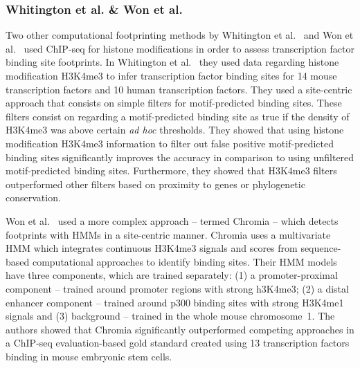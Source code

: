 \subsubsection{Whitington et al. \& Won et al.}
\label{sec:whitington.hon.2}

Two other computational footprinting methods by Whitington et al.~\cite{whitington2009} and Won et al.~\cite{won2010} used ChIP-seq for histone modifications in order to assess transcription factor binding site footprints. In Whitington et al.~\cite{whitington2009} they used data regarding histone modification H3K4me3 to infer transcription factor binding sites for 14 mouse transcription factors and 10 human transcription factors. They used a site-centric approach that consists on simple filters for motif-predicted binding sites. These filters consist on regarding a motif-predicted binding site as true if the density of H3K4me3 was above certain \emph{ad hoc} thresholds. They showed that using histone modification H3K4me3 information to filter out false positive motif-predicted binding sites significantly improves the accuracy in comparison to using unfiltered motif-predicted binding sites. Furthermore, they showed that H3K4me3 filters outperformed other filters based on proximity to genes or phylogenetic conservation.

Won et al.~\cite{won2010} used a more complex approach -- termed Chromia -- which detects footprints with HMMs in a site-centric manner. Chromia uses a multivariate HMM which integrates continuous H3K4me3 signals and scores from sequence-based computational approaches to identify binding sites. Their HMM models have three components, which are trained separately: (1) a promoter-proximal component -- trained around promoter regions with strong h3K4me3; (2) a distal enhancer component -- trained around p300 binding sites with strong H3K4me1 signals and (3) background -- trained in the whole mouse chromosome~1. The authors showed that Chromia significantly outperformed competing approaches in a ChIP-seq evaluation-based gold standard created using 13 transcription factors binding in mouse embryonic stem cells.


